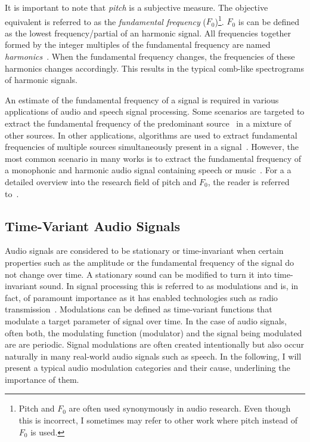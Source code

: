 It is important to note that \emph{pitch} is a subjective measure.
The objective equivalent is referred to as the \emph{fundamental frequency} (\(F_0\))\footnote{Pitch and $F_{0}$ are often used synonymously in audio research. Even though this is incorrect, I sometimes may refer to other work where pitch instead of $F_{0}$ is used.}.
\(F_{0}\) is can be defined as the lowest frequency/partial of an harmonic signal.
All frequencies together formed by the integer multiples of the fundamental frequency are named \textit{harmonics}~\cite{schenker54}.
When the fundamental frequency changes, the frequencies of these harmonics changes accordingly.
This results in the typical comb-like spectrograms of harmonic signals.
\par
An estimate of the fundamental frequency of a signal is required in various applications of audio and speech signal processing.
Some scenarios are targeted to extract the fundamental frequency of the predominant source~\cite{salamon12} in a mixture of other sources.
In other applications, algorithms are used to extract fundamental frequencies of multiple sources simultaneously present in a signal~\cite{klapuri03}.
However, the most common scenario in many works is to extract the fundamental frequency of a monophonic and harmonic audio signal containing speech or music~\cite{talkin95, boersma02, decheveigne02, resch07, tidhar10, christensen07}.
For a a detailed overview into the research field of pitch and \(F_{0}\), the reader is referred to~\cite{klapuri06book}.

\subsection{Time-Variant Audio Signals}\label{sub:time-variant-audio-signals}

Audio signals are considered to be stationary or time-invariant when certain properties such as the amplitude or the fundamental frequency of the signal do not change over time.
A stationary sound can be modified to turn it into time-invariant sound. 
In signal processing this is referred to as modulations and is, in fact, of paramount importance as it has enabled technologies such as radio transmission~\cite{shannon48}.
Modulations can be defined as time-variant functions that modulate a target parameter of signal over time.
In the case of audio signals, often both, the modulating function (modulator) and the signal being modulated are are periodic.
Signal modulations are often created intentionally but also occur naturally in many real-world audio signals such as speech.
In the following, I will present a typical audio modulation categories and their cause, underlining the importance of them.

